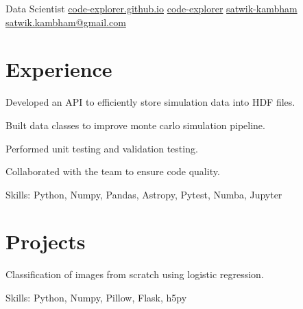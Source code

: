 \documentclass[]{absolute}
\begin{document}
%
%

{Data Scientist}
{\contactline
{\href{https://code-explorer.github.io/}{code-explorer.github.io}}
{\href{https://www.github.com/code-explorer}{code-explorer}}
{\href{https://www.linkedin.com/in/satwik-kambham/}{satwik-kambham}}
{\href{mailto:satwik.kambham@gmail.com}{satwik.kambham@gmail.com}}
}

%
%

\begin{minipage}[t]{0.65\textwidth} 



\section{Experience}
\vspace{\topsep}
\begin{tightemize}
\sectionsep
\item Developed an API to efficiently store simulation data into HDF files.
\item Built data classes to improve monte carlo simulation pipeline.
\item Performed unit testing and validation testing.
\item Collaborated with the team to ensure code quality.
\item Skills: Python, Numpy, Pandas, Astropy, Pytest, Numba, Jupyter
\end{tightemize}
\sectionsep



\section{Projects}

\begin{tightemize}
\item Classification of images from scratch using logistic regression.
\item Skills: Python, Numpy, Pillow, Flask, h5py
\end{tightemize}
\sectionsep


\end{minipage}
\end{document}
